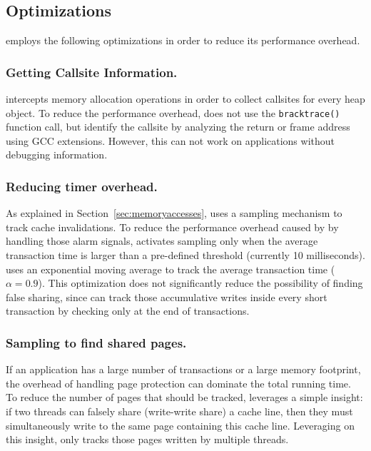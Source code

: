 \subsection{Optimizations}

\SheriffDetect{} employs the following optimizations in order to reduce its performance overhead. 

\subsubsection{Getting Callsite Information.}
\label{sec:sheriffcallsite}

\SheriffDetect{} intercepts memory allocation operations in order to collect callsites for every heap object. To reduce the performance overhead, \SheriffDetect{} does not use the \texttt{bracktrace()} function call, but identify the callsite by analyzing the return or frame address using GCC extensions. However, this can not work on applications without debugging information. 

\subsubsection{Reducing timer overhead.}
As explained in Section~\ref{sec:memoryaccesses}, \SheriffDetect{} uses a sampling mechanism to track cache invalidations. To reduce the performance overhead caused by by handling those alarm signals, \SheriffDetect{} activates sampling only when the average transaction time is larger than a pre-defined threshold (currently 10 milliseconds). \SheriffDetect{} uses an exponential moving average to track the average transaction time ($\alpha = 0.9$). This optimization does not significantly reduce the possibility of finding false sharing, since \SheriffDetect{} can track those accumulative writes inside every short transaction by checking only at the end of transactions.

\subsubsection{Sampling to find shared pages.} 
If an application has a large number of transactions or a large memory footprint, the overhead of handling page protection can dominate the total running time.
To reduce the number of pages that should be tracked, \SheriffDetect{} leverages a
simple insight: if two threads can falsely share (write-write share) a cache line, then they must simultaneously write to the same page containing this cache line. 
Leveraging on this insight, \SheriffDetect{} only tracks those pages written by multiple threads. 


